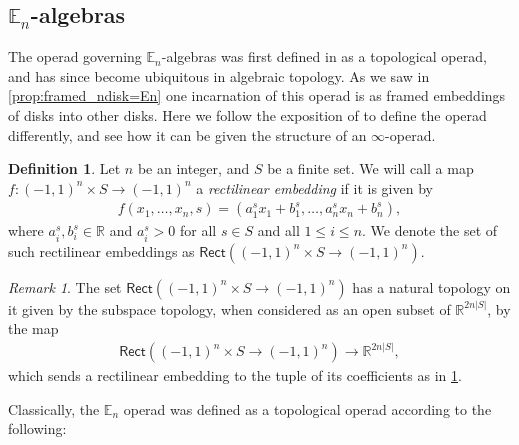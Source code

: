 \documentclass[12pt,a4paper]{article}
\newcounter{counter} \numberwithin{counter}{section}
\theoremstyle{definition}
\newtheorem{definition}[counter]{Definition}
\theoremstyle{plain}
\theoremstyle{remark}
\newtheorem{remark}[counter]{Remark}
\begin{document}
\begin{appendices}

\section{\texorpdfstring{$\mathbb{E}_n$}{En}-algebras}\label{app:En_algebras}

The operad governing $\mathbb{E}_n$-algebras was first defined in \cite{bv73} as a topological operad, and has since become ubiquitous in algebraic topology. As we saw in \cref{prop:framed_ndisk=En} one incarnation of this operad is as framed embeddings of disks into other disks. Here we follow the exposition of \cite[sec.5.1]{lurie_ha} to define the operad differently, and see how it can be given the structure of an $\infty$-operad.

\begin{definition}\label{def:rect_embedding}
    Let $n$ be an integer, and $S$ be a finite set. We will call a map $f:(-1,1)^n \times S \rightarrow (-1,1)^n$ a \emph{rectilinear embedding} if it is given by
    \begin{align}
        f(x_1, \dots, x_n, s) = (a^s_1 x_1 + b^s_1, \dots, a^s_n x_n + b^s_n),
    \end{align}
    where $a^s_i, b^s_i \in \mathbb{R}$ and $a^s_i > 0$ for all $s \in S$ and all $1 \leq i \leq n$. We denote the set of such rectilinear embeddings as $\mathsf{Rect}((-1,1)^n \times S \rightarrow (-1,1)^n)$.
\end{definition}

\begin{remark}
    The set $\mathsf{Rect}((-1,1)^n \times S \rightarrow (-1,1)^n)$ has a natural topology on it given by the subspace topology, when considered as an open subset of $\mathbb{R}^{2n |S|}$, by the map
    \begin{align}
        \mathsf{Rect}((-1,1)^n \times S \rightarrow (-1,1)^n) \xrightarrow{\quad} \mathbb{R}^{2n |S|},
    \end{align}
    which sends a rectilinear embedding to the tuple of its coefficients as in \cref{def:rect_embedding}.
\end{remark}

Classically, the $\mathbb{E}_n$ operad was defined as a topological operad according to the following:


\end{appendices}
\end{document}
